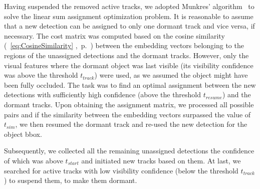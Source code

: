 Having suspended the removed active tracks, we adopted Munkres' algorithm~\cite{munkres1957assignment} to solve the linear sum assignment optimization problem. It is reasonable to assume that a new detection can be assigned to only one dormant track and vice versa, if necessary. The cost matrix was computed based on the cosine similarity (\eqtext{}~\ref{eq:CosineSimilarity} ,~p.~\pageref{eq:CosineSimilarity}) between the embedding vectors belonging to the regions of the unassigned detections and the dormant tracks. However, only the visual features where the dormant object was last visible (its visibility confidence was above the threshold $t_{track}$) were used, as we assumed the object might have been fully occluded. The task was to find an optimal assignment between the new detections with sufficiently high confidence (above the threshold $t_{resume}$) and the dormant tracks. Upon obtaining the assignment matrix, we processed all possible pairs and if the similarity between the embedding vectors surpassed the value of $t_{sim}$, we then resumed the dormant track and re-used the new detection for the object \gls{bbox}.

Subsequently, we collected all the remaining unassigned detections the confidence of which was above $t_{start}$ and initiated new tracks based on them. At last, we searched for active tracks with low visibility confidence (below the threshold $t_{track}$) to suspend them, to make them dormant.

